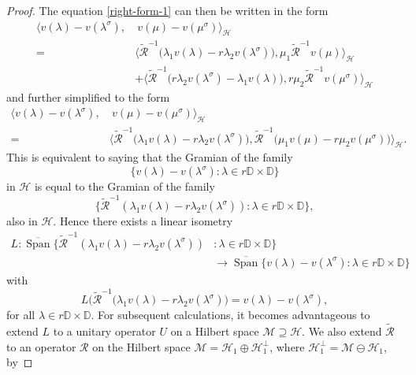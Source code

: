 \documentclass[10pt,a4paper]{amsart}
\DeclareMathOperator{\spn}{Span}
\begin{document}
\begin{proof}
The equation \eqref{right-form-1} can then be written in the form
\begin{align*}
\Big\langle v(\lambda) - v(\lambda^{\sigma}),& \ v(\mu)-v(\mu^{\sigma})\Big\rangle_{\mathcal{H}} \\
=&\Big\langle \widetilde{\mathcal{R}}^{-1}\big(\lambda_{1} v(\lambda)-r\lambda_{2}v(\lambda^{\sigma})\big), \mu_{1}\widetilde{\mathcal{R}}^{-1}v(\mu)\Big\rangle_{\mathcal{H}} \\
&+\Big\langle \widetilde{\mathcal{R}}^{-1}\big(r\lambda_{2}v(\lambda^{\sigma}) - \lambda_{1}v(\lambda)\big),r\mu_{2}\widetilde{\mathcal{R}}^{-1}v(\mu^{\sigma}) \Big\rangle_{\mathcal{H}} 
\end{align*}
and further simplified to the form
\begin{align*}
\Big\langle v(\lambda) - v(\lambda^{\sigma}), & \ v(\mu)-v(\mu^{\sigma})\Big\rangle_{\mathcal{H}} \\
=&\Big\langle \widetilde{\mathcal{R}}^{-1}\big(\lambda_{1} v(\lambda)-r\lambda_{2}v(\lambda^{\sigma})\big), \widetilde{\mathcal{R}}^{-1}\big(\mu_{1}v(\mu)-r\mu_{2}v(\mu^{\sigma})\big)\Big\rangle_{\mathcal{H}}.
\end{align*}
This is equivalent to saying that the Gramian of the family 
$$\{v({\lambda})-v({\lambda}^{\sigma}):\lambda\in r\mathbb{D}\times\mathbb{D}\}$$ in $\mathcal{H}$ is equal to the Gramian of the family 
$$\{\widetilde{\mathcal{R}}^{-1}(\lambda_{1}v({\lambda})-r\lambda_{2}v({\lambda}^{\sigma})) : \lambda \in r\mathbb{D}\times\mathbb{D}\},$$ also in $\mathcal{H}$. Hence
there exists a linear isometry 
\begin{align*}
 L :  \overline{\spn}\Big\{\widetilde{\mathcal{R}}^{-1}(\lambda_{1}v({\lambda})- r\lambda_{2}v({\lambda}^{\sigma})) & : \lambda \in r\mathbb{D}\times\mathbb{D}\Big\} \\
& \rightarrow \overline{\spn}\Big\{v({\lambda})-v({\lambda}^{\sigma}) : \lambda\in r\mathbb{D}\times\mathbb{D}\Big\}
\end{align*}
with
\begin{equation}\label{isometryonthegramian}
L\Big( \widetilde{\mathcal{R}}^{-1}(\lambda_{1}v({\lambda})-r\lambda_{2}v({\lambda}^{\sigma})\Big) = v({\lambda})-v({\lambda}^{\sigma}),
\end{equation}
for all $\lambda \in r\mathbb{D}\times \mathbb{D}$. For subsequent calculations, it becomes advantageous to extend $L$ to a unitary operator $U$ on a Hilbert space $\mathcal{M}\supseteq \mathcal{H}$. We also extend $\widetilde{\mathcal{R}}$ to an operator $\mathcal{R}$ on the Hilbert space $\mathcal{M}=\mathcal{H}_{1}\oplus \mathcal{H}_{1}^{\perp}$, where $\mathcal{H}_{1}^{\perp}= \mathcal{M} \ominus \mathcal{H}_{1}$,  by

\end{proof}
\end{document}
